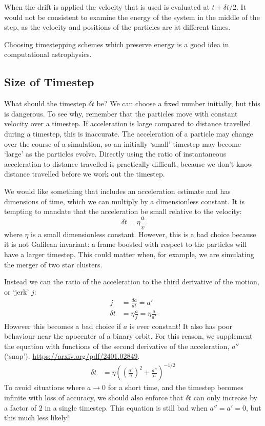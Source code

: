 \documentclass[12pt]{article}
\begin{document}
When the drift is applied the velocity that is used is evaluated at $t + \delta t /2$. It would not be consistent to examine the energy of the system in the middle of the step, as the velocity and positions of the particles are at different times.

Choosing timestepping schemes which preserve energy is a good idea in computational astrophysics.

\subsection{Size of Timestep}

What should the timestep $\delta t$ be? We can choose a fixed number initially, but this is dangerous. To see why, remember that the particles move with constant velocity over a timestep. If acceleration is large compared to distance travelled during a timestep, this is inaccurate. The acceleration of a particle may change over the course of a simulation, so an initially `small' timestep may become `large' as the particles evolve. Directly using the ratio of instantaneous acceleration to distance travelled is practically difficult, because we don't know distance travelled before we work out the timestep.

We would like something that includes an acceleration estimate and has dimensions of time, which we can multiply by a dimensionless constant. It is tempting to mandate that the acceleration be small relative to the velocity:
\begin{equation}
 \delta t = \eta \frac{a}{v}
\end{equation}
where $\eta$ is a small dimensionless constant. However, this is a bad choice because it is not Galilean invariant: a frame boosted with respect to the particles will have a larger timestep. This could matter when, for example, we are simulating the merger of two star clusters.

Instead we can the ratio of the acceleration to the third derivative of the motion, or `jerk' $j$:
\begin{align}
 j &= \frac{d a}{dt}  = a' \\
 \delta t  &= \eta \frac{a}{j} = \eta \frac{a}{a'}
\end{align}
However this becomes a bad choice if $a$ is ever constant! It also has poor behaviour near the apocenter of a binary orbit. For this reason, we supplement the equation with functions of the second derivative of the acceleration, $a''$ (`snap'). \url{https://arxiv.org/pdf/2401.02849}.
\begin{align}
\delta t &= \eta \left( \left(\frac{a'}{a}\right)^2 + \frac{a''}{a}\right)^{-1/2}
\end{align}
To avoid situations where $a \to 0$ for a short time, and the timestep becomes infinite with loss of accuracy, we should also enforce that $\delta t$ can only increase by a factor of $2$ in a single timestep. This equation is still bad when $a'' = a' = 0$, but this much less likely!
\end{document}
